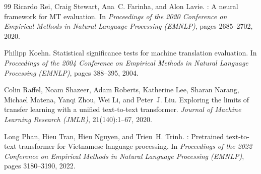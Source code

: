 \documentclass[11pt,a4paper]{article}
\begin{document}
\begin{thebibliography}{99}
Ricardo Rei, Craig Stewart, Ana~C. Farinha, and Alon Lavie.
: A neural framework for {MT} evaluation.
\newblock In \emph{Proceedings of the 2020 Conference on Empirical Methods in Natural Language Processing (EMNLP)}, pages 2685--2702, 2020.

Philipp Koehn.
\newblock Statistical significance tests for machine translation evaluation.
\newblock In \emph{Proceedings of the 2004 Conference on Empirical Methods in Natural Language Processing (EMNLP)}, pages 388--395, 2004.

Colin Raffel, Noam Shazeer, Adam Roberts, Katherine Lee, Sharan Narang, Michael Matena, Yanqi Zhou, Wei Li, and Peter~J. Liu.
\newblock Exploring the limits of transfer learning with a unified text-to-text transformer.
\newblock \emph{Journal of Machine Learning Research (JMLR)}, 21(140):1--67, 2020.

Long Phan, Hieu Tran, Hieu Nguyen, and Trieu~H. Trinh.
: Pretrained text-to-text transformer for {V}ietnamese language processing.
\newblock In \emph{Proceedings of the 2022 Conference on Empirical Methods in Natural Language Processing (EMNLP)}, pages 3180--3190, 2022.

\end{thebibliography}
\end{document}
